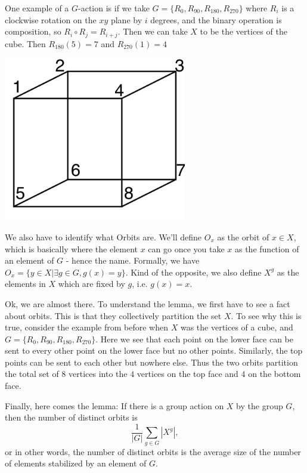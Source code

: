 \documentclass{article}
\begin{document}
One example of a $G$-action is if we take $G=\{R_0,R_{90},R_{180},R_{270}\}$  where $R_i$ is a clockwise rotation on the $xy$ plane by $i$ degrees, and the binary operation is composition, so $R_i \circ R_j = R_{i+j}.$ Then we can take $X$ to be the vertices of the cube. Then $R_{180}(5)=7$ and $R_{270}(1)=4$
\begin{center}
    \includegraphics[width=8cm, scale=1]{images/Labeled_cube_graph.png}
\end{center}


We also have to identify what Orbits are. We'll define $O_x$ as the orbit of $x\in X$, which is basically where the element $x$ can go once you take $x$ as the function of an element of $G$ - hence the name. Formally, we have $O_x=\{y\in X | \exists g\in G, g(x)=y\}.$ Kind of the opposite, we also define $X^g$ as the elements in $X$ which are fixed by $g$, i.e. $g(x) = x$.

Ok, we are almost there. To understand the lemma, we first have to see a fact about orbits. This is that they collectively partition the set $X$. To see why this is true, consider the example from before when $X$ was the vertices of a cube, and $G=\{R_0,R_{90},R_{180},R_{270}\}$. Here we see that each point on the lower face can be sent to every other point on the lower face but no other points. Similarly, the top points can be sent to each other but nowhere else. Thus the two orbits partition the total set of $8$ vertices into the $4$ vertices on the top face and $4$ on the bottom face.

Finally, here comes the lemma: If there is a group action on $X$ by the group $G$, then the number of distinct orbits is $$\frac{1}{|G|}\sum_{g\in G}|X^g|,$$
or in other words, the number of distinct orbits is the average size of the number of elements stabilized by an element of $G$.
\end{document}
